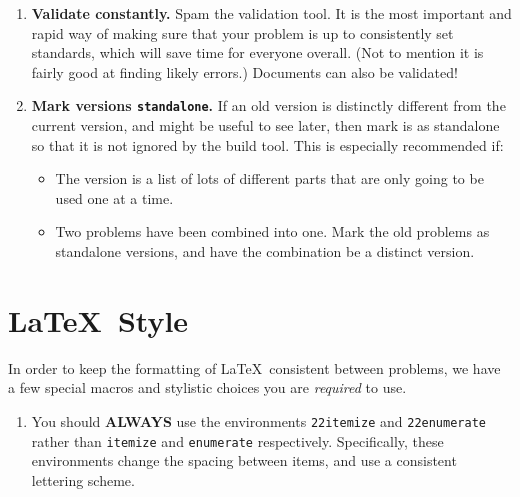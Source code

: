 {\begin{enumerate}
      As an example, let's say you write a question that focuses on graph
      theory, but incorporates some set theory, and probability: you should
      DEFINITELY include all three of them as topics. If we are looking for a
      question on the set theory homework, it is easy to not include graph
      theory questions, so the inclusion of the topic does no harm. But the
      extra information is still useful if we are looking for a question that
      connects back to set theory when making a graph theory homework.
    \item \textbf{Validate constantly.} Spam the validation tool. It is the
      most important and rapid way of making sure that your problem is up to
      consistently set 
      standards, which will save time for everyone overall. (Not to mention it
      is fairly good at finding likely errors.)
      Documents can also be validated!
    \item \textbf{Mark versions \texttt{standalone}.} If an old version is
      distinctly different from the current version, and might be useful to
      see later, then mark is as standalone so that it is not ignored by
      the build tool. This is especially recommended if:
        \begin{itemize}
          \item The version is a list of lots of different parts that are 
          only going to be used one at a time.
          \item Two problems have been combined into one. Mark the old
          problems as standalone versions, and have the combination be a 
          distinct version.
        \end{itemize}
  \end{enumerate}

\section{\LaTeX\ Style}
  In order to keep the formatting of \LaTeX\ consistent between problems, we 
  have a few special macros and stylistic choices you are \textit{required}
  to use.
  
  \begin{enumerate}
    \item You should \textbf{ALWAYS} use the environments \texttt{22itemize} 
      and \texttt{22enumerate} rather than \texttt{itemize} and 
      \texttt{enumerate} respectively. Specifically, these environments 
      change the spacing between items, and use a consistent lettering scheme.
      

\end{enumerate}}
